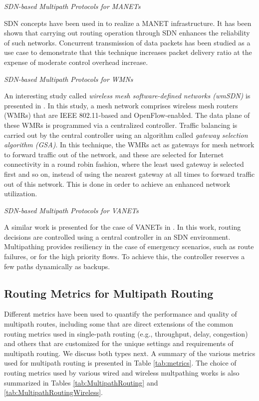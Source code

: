 \documentclass[10pt]{IEEEtran}
\begin{document}
\vspace{2mm}
\textit{SDN-based Multipath Protocols for MANETs}
\vspace{1mm}

SDN concepts have been used in \cite{kusoftware} to realize a MANET infrastructure. It has been shown that carrying out routing operation through SDN enhances the reliability of such networks. Concurrent transmission of data packets has been studied as a use case to demonstrate that this technique increases packet delivery ratio at the expense of moderate control overhead increase.

\vspace{2mm}
\textit{SDN-based Multipath Protocols for WMNs}
\vspace{1mm}

An interesting study called \textit{wireless mesh software-defined networks (wmSDN)} is presented in \cite{detti2013wireless}. In this study, a mesh network comprises wireless mesh routers (WMRs) that are IEEE 802.11-based and OpenFlow-enabled. The data plane of these WMRs is programmed via a centralized controller. Traffic balancing is carried out by the central controller using an algorithm called \textit{gateway selection algorithm (GSA)}. In this technique, the WMRs act as gateways for mesh network to forward traffic out of the network, and these are selected for Internet connectivity in a round robin fashion, where the least used gateway is selected first and so on, instead of using the nearest gateway at all times to forward traffic out of this network. This is done in order to achieve an enhanced network utilization. 

\vspace{2mm}
\textit{SDN-based Multipath Protocols for VANETs}
\vspace{1mm}

A similar work is presented for the case of VANETs in \cite{kutowards}. In this work, routing decisions are controlled using a central controller in an SDN environment. Multipathing provides resiliency in the case of emergency scenarios, such as route failures, or for the high priority flows. To achieve this, the controller reserves a few paths dynamically as backups.

\subsection{Routing Metrics for Multipath Routing}
\label{sec:metric_cat}

Different metrics have been used to quantify the performance and quality of multipath routes, including some that are direct extensions of the common routing metrics used in single-path routing (e.g., throughput, delay, congestion) and others that are customized for the unique settings and requirements of multipath routing. We discuss both types next. A summary of the various metrics used for multipath routing is presented in Table \ref{tab:metrics}. The choice of routing metrics used by various wired and wireless multpathing works is also summarized in Tables \ref{tab:MultipathRouting} and \ref{tab:MultipathRoutingWireless}. 
\end{document}
